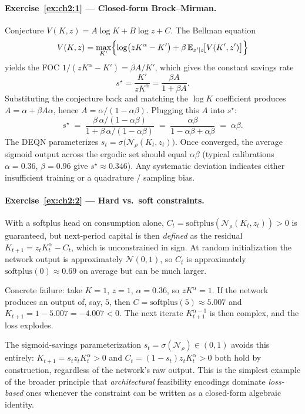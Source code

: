 \documentclass[11pt,a4paper]{report}
\begin{document}
\paragraph{Exercise~\ref{ex:ch2:1} --- Closed-form Brock--Mirman.}
Conjecture $V(K, z) = A\log K + B\log z + C$.  The Bellman equation
\[
   V(K,z) = \max_{K'}\Bigl\{\log\bigl(zK^\alpha - K'\bigr) + \beta\,\mathbb{E}_{z'\mid z}\!\bigl[V(K', z')\bigr]\Bigr\}
\]
yields the FOC $1/(zK^\alpha - K') = \beta A/K'$, which gives the constant savings rate
\[
   s^\star = \frac{K'}{zK^\alpha} = \frac{\beta A}{1 + \beta A}.
\]
Substituting the conjecture back and matching the $\log K$ coefficient produces $A = \alpha + \beta A\alpha$, hence $A = \alpha/(1-\alpha\beta)$.  Plugging this $A$ into $s^\star$:
\[
   s^\star \;=\; \frac{\beta\,\alpha/(1-\alpha\beta)}{1 + \beta\,\alpha/(1-\alpha\beta)} \;=\; \frac{\alpha\beta}{1-\alpha\beta+\alpha\beta} \;=\; \alpha\beta.
\]
The DEQN parameterizes $s_t = \sigma\!\bigl(\mathcal{N}_\rho(K_t, z_t)\bigr)$.  Once converged, the average sigmoid output across the ergodic set should equal $\alpha\beta$ (typical calibrations $\alpha=0.36$, $\beta=0.96$ give $s^\star \approx 0.346$).  Any systematic deviation indicates either insufficient training or a quadrature / sampling bias.

\paragraph{Exercise~\ref{ex:ch2:2} --- Hard vs.\ soft constraints.}
With a softplus head on consumption alone, $C_t = \mathrm{softplus}(\mathcal{N}_\rho(K_t, z_t)) > 0$ is guaranteed, but next-period capital is then \emph{defined} as the residual $K_{t+1} = z_t K_t^\alpha - C_t$, which is unconstrained in sign.  At random initialization the network output is approximately $\mathcal{N}(0, 1)$, so $C_t$ is approximately $\mathrm{softplus}(0) \approx 0.69$ on average but can be much larger.

Concrete failure: take $K = 1$, $z = 1$, $\alpha = 0.36$, so $zK^\alpha = 1$.  If the network produces an output of, say, $5$, then $C = \mathrm{softplus}(5) \approx 5.007$ and $K_{t+1} = 1 - 5.007 = -4.007 < 0$.  The next iterate $K_{t+1}^{\alpha-1}$ is then complex, and the loss explodes.

The sigmoid-savings parameterization $s_t = \sigma(\mathcal{N}_\rho) \in (0,1)$ avoids this entirely: $K_{t+1} = s_t z_t K_t^\alpha > 0$ and $C_t = (1-s_t) z_t K_t^\alpha > 0$ both hold by construction, regardless of the network's raw output.  This is the simplest example of the broader principle that \emph{architectural} feasibility encodings dominate \emph{loss-based} ones whenever the constraint can be written as a closed-form algebraic identity.
\end{document}
